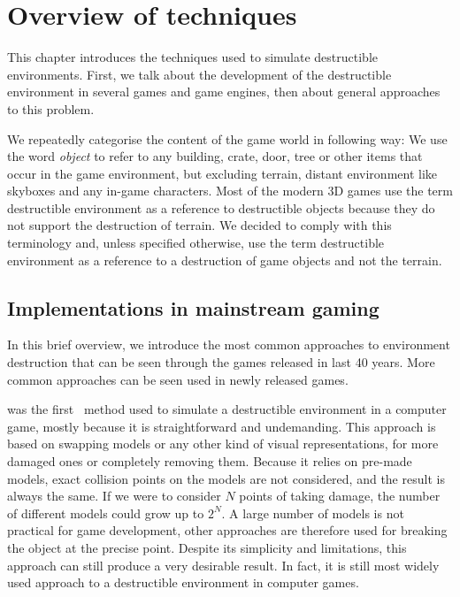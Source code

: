 \chapter{Overview of techniques}
This chapter introduces the techniques used to simulate destructible environments. First, we talk about the development of the destructible environment in several games and game engines, then about general approaches to this problem.

We repeatedly categorise the content of the game world in following way: We use the word \emph{object} to refer to any building, crate, door, tree or other items that occur in the game environment, but excluding terrain, distant environment like skyboxes and any in-game characters. Most of the modern 3D games use the term destructible environment as a reference to destructible objects because they do not support the destruction of terrain. We decided to comply with this terminology and, unless specified otherwise, use the term destructible environment as a reference to a destruction of game objects and not the terrain.

\section{Implementations in mainstream gaming}
\label{sec:common}
In this brief overview, we introduce the most common approaches to environment destruction that can be seen through the games released in last 40 years. More common approaches can be seen used in newly released games.

 was the first~\cite{history} method used to simulate a destructible environment in a computer game, mostly because it is straightforward and undemanding. This approach is based on swapping models or any other kind of visual representations, for more damaged ones or completely removing them. Because it relies on pre-made models, exact collision points on the models are not considered, and the result is always the same. If we were to consider $N$ points of taking damage, the number of different models could grow up to $2^N$. A large number of models is not practical for game development, other approaches are therefore used for breaking the object at the precise point. Despite its simplicity and limitations, this approach can still produce a very desirable result. In fact, it is still most widely used approach to a destructible environment in computer games.

